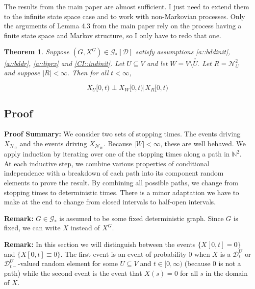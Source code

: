 \documentclass[12pt]{article}
\newcommand{\skipLine}{\vspace{12pt}}
\newcommand{\mb}{\mathbb}
\newcommand{\mc}{\mathcal}
\newcommand{\ov}{\overline}
\newcommand{\pfsum}{\textbf{Proof Summary: }}
\newcommand{\remark}{\textbf{Remark: }}
\newcommand{\cad}{\mc{D}}							%
\newcommand{\neigh}[1]{\mc{N}_{#1}}					%
\newcommand{\dneigh}[1]{\mc{N}^2_{#1}}				%
\newcommand{\Xf}{X}									%
\newcommand{\vind}[1]{_{#1}}						%
\newcommand{\tme}[1]{(#1)}							%
\newcommand{\tmi}[1]{#1}							%
\newcommand{\gind}[1]{^{#1}}						%
\newcommand{\vpara}[1]{^{#1}}						%
\newcommand{\tpara}[1]{_{#1}}						%
\newcommand{\Gs}{\mc{G}_\ast}						%
\renewcommand{\sp}[1]{[#1]}							%
\newcommand{\seto}{U}								%
\newcommand{\sett}{W}								%
\newcommand{\setc}{R}								%
\newtheorem{thms}{Theorem}[section]
\begin{document}
The results from the main paper are almost sufficient. I just need to extend them to the infinite state space case and to work with non-Markovian processes. Only the arguments of Lemma 4.3 from the main paper rely on the process having a finite state space and Markov structure, so I only have to redo that one.

\begin{thms}
Suppose \((G,\Xf\gind{G})\in \Gs\sp{\cad}\) satisfy assumptions \ref{a::bddinit},\ref{a::bddr}, \ref{a::liprx} and \ref{CI::indinit}. Let \(\seto \subseteq V\) and let \(\sett = V\setminus \ov{\ov{\seto}}\). Let \(\setc = \dneigh{\seto}\) and suppose \(|\setc| < \infty\). Then for all \(t < \infty\),

\begin{equation}
\Xf\vind{\seto}\tmi{[0,t)}\perp \Xf\vind{\sett}\tmi{[0,t)}|\Xf\vind{\setc}\tmi{[0,t)}
\label{CI::CIeqn}
\end{equation}

\label{CI::CI}
\end{thms}

\subsection{Proof}
\label{CI::CIpf}

\pfsum We consider two sets of stopping times. The events driving \(\Xf\vind{\neigh{\seto}}\) and the events driving \(\Xf\vind{\neigh{\sett}}\). Because \(|\sett| < \infty\), these are well behaved. We apply induction by iterating over one of the stopping times along a path in \(\mb{N}^2\). At each inductive step, we combine various properties of conditional independence with a breakdown of each path into its component random elements to prove the result. By combining all possible paths, we change from stopping times to deterministic times. There is a minor adaptation we have to make at the end to change from closed intervals to half-open intervals.

\skipLine

\remark \(G\in \Gs\) is assumed to be some fixed deterministic graph. Since \(G\) is fixed, we can write \(\Xf\) instead of \(\Xf\gind{G}\).

\skipLine

\remark In this section we will distinguish between the events \(\{\Xf\tmi{[0,t]} = 0\}\) and \(\{\Xf\tmi{[0,t]}\equiv 0\}\). The first event is an event of probability 0 when \(\Xf\) is a \(\cad\vpara{\seto}\tpara{t}\) or \(\cad\vpara{\seto}\tpara{t-}\)-valued random element for some \(\seto\subseteq V\) and \(t \in [0,\infty)\) (because 0 is not a path) while the second event is the event that \(\Xf\tme{s} = 0\) for all \(s\) in the domain of \(\Xf\).
\end{document}
